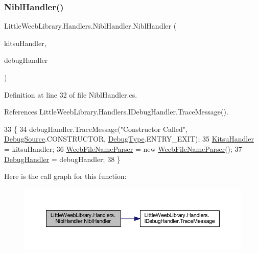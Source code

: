 \subsubsection{\texorpdfstring{Nibl\+Handler()}{NiblHandler()}}
{\footnotesize\ttfamily Little\+Weeb\+Library.\+Handlers.\+Nibl\+Handler.\+Nibl\+Handler (\begin{DoxyParamCaption}\item[{\mbox{\hyperlink{interface_little_weeb_library_1_1_handlers_1_1_i_kitsu_handler}{I\+Kitsu\+Handler}}}]{kitsu\+Handler,  }\item[{\mbox{\hyperlink{interface_little_weeb_library_1_1_handlers_1_1_i_debug_handler}{I\+Debug\+Handler}}}]{debug\+Handler }\end{DoxyParamCaption})}



Definition at line 32 of file Nibl\+Handler.\+cs.



References Little\+Weeb\+Library.\+Handlers.\+I\+Debug\+Handler.\+Trace\+Message().


\begin{DoxyCode}
33         \{
34             debugHandler.TraceMessage(\textcolor{stringliteral}{"Constructor Called"}, \mbox{\hyperlink{namespace_little_weeb_library_1_1_handlers_a2a6ca0775121c9c503d58aa254d292be}{DebugSource}}.CONSTRUCTOR, 
      \mbox{\hyperlink{namespace_little_weeb_library_1_1_handlers_ab66019ed40462876ec4e61bb3ccb0a62}{DebugType}}.ENTRY\_EXIT);
35             \mbox{\hyperlink{class_little_weeb_library_1_1_handlers_1_1_nibl_handler_ac0392c6b723e01d26c8a45d64575c5af}{KitsuHandler}} = kitsuHandler;
36             \mbox{\hyperlink{class_little_weeb_library_1_1_handlers_1_1_nibl_handler_a0aae159f51f737bbb89946b8fe8c8743}{WeebFileNameParser}} = \textcolor{keyword}{new} \mbox{\hyperlink{class_little_weeb_library_1_1_handlers_1_1_nibl_handler_a0aae159f51f737bbb89946b8fe8c8743}{WeebFileNameParser}}();
37             \mbox{\hyperlink{class_little_weeb_library_1_1_handlers_1_1_nibl_handler_a334c2111588fa71d1203bd8cbb572970}{DebugHandler}} = debugHandler;
38         \}
\end{DoxyCode}
Here is the call graph for this function\+:\nopagebreak
\begin{figure}[H]
\begin{center}
\leavevmode
\includegraphics[width=350pt]{class_little_weeb_library_1_1_handlers_1_1_nibl_handler_afdd2ee189bd6bec0a1fb4a309498e6c2_cgraph}
\end{center}
\end{figure}


